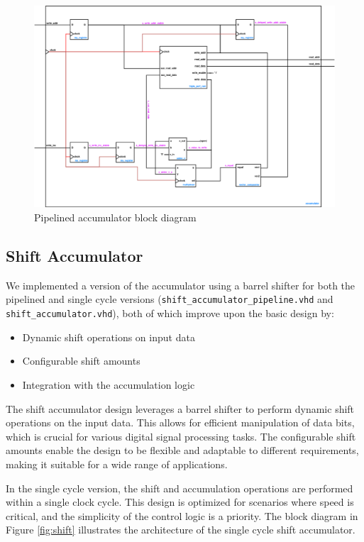 \documentclass[a4paper,12pt]{article}
\begin{document}
\begin{figure}[H]
    \centering
    \includegraphics[width=1.0\linewidth]{accumulator_pipeline.png}
    \caption{Pipelined accumulator block diagram}
    \label{fig:pipeline}
\end{figure}

\subsection{Shift Accumulator}
We implemented a version of the accumulator using a barrel shifter for both the pipelined and single cycle versions (\texttt{shift\_accumulator\_pipeline.vhd} and \texttt{shift\_accumulator.vhd}), both of which improve upon the basic design by:
\begin{itemize}
    \item Dynamic shift operations on input data
    \item Configurable shift amounts
    \item Integration with the accumulation logic
\end{itemize}

The shift accumulator design leverages a barrel shifter to perform dynamic shift operations on the input data. This allows for efficient manipulation of data bits, which is crucial for various digital signal processing tasks. The configurable shift amounts enable the design to be flexible and adaptable to different requirements, making it suitable for a wide range of applications.

In the single cycle version, the shift and accumulation operations are performed within a single clock cycle. This design is optimized for scenarios where speed is critical, and the simplicity of the control logic is a priority. The block diagram in Figure \ref{fig:shift} illustrates the architecture of the single cycle shift accumulator.
\end{document}
